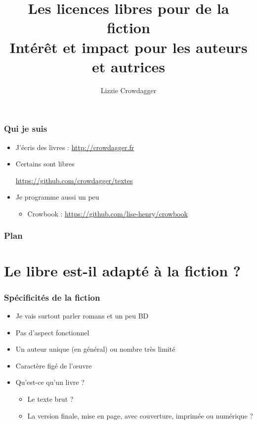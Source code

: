 \documentclass[11pt]{beamer}
\author{Lizzie Crowdagger}
\title{Les licences libres pour de la fiction\\Intérêt et impact pour les auteurs et autrices}
\begin{document}
\begin{frame}
  \titlepage
\end{frame}

\begin{frame}
  \frametitle{Qui je suis}
  \begin{itemize}
  \item J'écris des livres : \url{http://crowdagger.fr}
  \item Certains sont libres %
    \begin{center}
%
    \end{center}
    \url{https://github.com/crowdagger/textes}
  \item Je programme aussi un peu
    \begin{itemize}
    \item Crowbook : \url{https://github.com/lise-henry/crowbook}
    \end{itemize}
  \end{itemize}
\end{frame}

\begin{frame}
  \frametitle{Plan}
  \tableofcontents
\end{frame}

\section{Le libre est-il adapté à la fiction ?}

\begin{frame}
  \frametitle{Spécificités de la fiction}
  \begin{itemize}
  \item Je vais surtout parler romans et un peu BD
  \item Pas d'aspect fonctionnel
  \item Un auteur unique (en général) ou nombre très limité
  \item Caractère figé de l'œuvre
  \item Qu'est-ce qu'un livre ?
    \begin{itemize}
    \item Le texte brut ?
    \item La version finale, mise en page, avec couverture, imprimée
      ou numérique ?
    \end{itemize}
  \end{itemize}
\end{frame}
\end{document}
